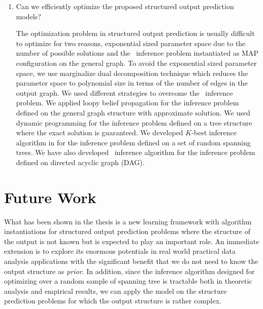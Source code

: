 {\begin{enumerate}[label=\textbf{Q \Roman*}:]
\item Can we efficiently optimize the proposed structured output prediction models?

The optimization problem in structured output prediction is usually difficult to optimize for two reasons, exponential sized parameter space due to the number of possible solutions and the \nphard\ inference problem instantiated as MAP configuration on the general graph.
To avoid the exponential sized parameter space, we use marginalize dual decomposition technique which reduces the parameter space to polynomial size in terms of the number of edges in the output graph.
We used different strategies to overcome the \nphard\ inference problem.
We applied loopy belief propagation for the inference problem defined on the general graph structure with approximate solution.
We used dynamic programming for the inference problem defined on a tree structure where the exact solution is guaranteed.
We developed $K$-best inference algorithm in  for the inference problem defined on a set of random spanning trees.
We have also developed \sdp\ inference algorithm for the inference problem defined on directed acyclic graph (DAG).
\end{enumerate}


\section{Future Work}

What has been shown in the thesis is a new learning framework with algorithm instantiations for structured output prediction problems where the structure of the output is not known but is expected to play an important role.
An immediate extension is to explore its enormous potentials in real world practical data analysis applications with the significant benefit that we do not need to know the output structure as \textit{prior}.
In addition, since the inference algorithm designed for optimizing over a random sample of spanning tree is tractable both in theoretic analysis and empirical results, we can apply the model on the structure prediction problems for which the output structure is rather complex.

}
